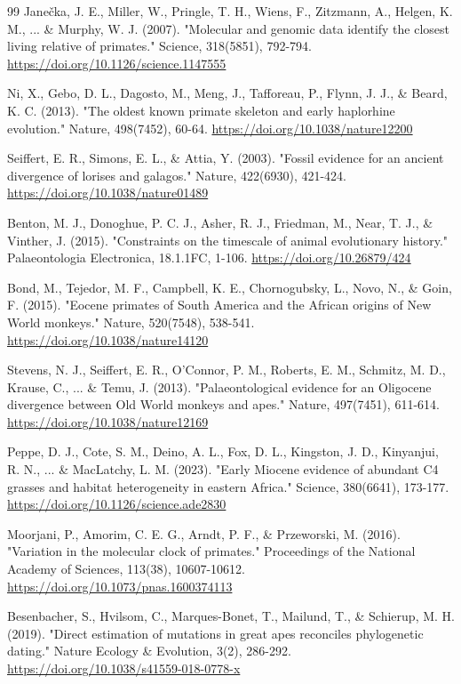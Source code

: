 \documentclass[10pt,letterpaper]{article}
\begin{document}
\begin{thebibliography}{99}
 Jane\v{c}ka, J. E., Miller, W., Pringle, T. H., Wiens, F., Zitzmann, A., Helgen, K. M., ... \& Murphy, W. J. (2007). "Molecular and genomic data identify the closest living relative of primates." Science, 318(5851), 792-794. \url{https://doi.org/10.1126/science.1147555}

 Ni, X., Gebo, D. L., Dagosto, M., Meng, J., Tafforeau, P., Flynn, J. J., \& Beard, K. C. (2013). "The oldest known primate skeleton and early haplorhine evolution." Nature, 498(7452), 60-64. \url{https://doi.org/10.1038/nature12200}

 Seiffert, E. R., Simons, E. L., \& Attia, Y. (2003). "Fossil evidence for an ancient divergence of lorises and galagos." Nature, 422(6930), 421-424. \url{https://doi.org/10.1038/nature01489}

 Benton, M. J., Donoghue, P. C. J., Asher, R. J., Friedman, M., Near, T. J., \& Vinther, J. (2015). "Constraints on the timescale of animal evolutionary history." Palaeontologia Electronica, 18.1.1FC, 1-106. \url{https://doi.org/10.26879/424}

 Bond, M., Tejedor, M. F., Campbell, K. E., Chornogubsky, L., Novo, N., \& Goin, F. (2015). "Eocene primates of South America and the African origins of New World monkeys." Nature, 520(7548), 538-541. \url{https://doi.org/10.1038/nature14120}

 Stevens, N. J., Seiffert, E. R., O'Connor, P. M., Roberts, E. M., Schmitz, M. D., Krause, C., ... \& Temu, J. (2013). "Palaeontological evidence for an Oligocene divergence between Old World monkeys and apes." Nature, 497(7451), 611-614. \url{https://doi.org/10.1038/nature12169}

 Peppe, D. J., Cote, S. M., Deino, A. L., Fox, D. L., Kingston, J. D., Kinyanjui, R. N., ... \& MacLatchy, L. M. (2023). "Early Miocene evidence of abundant C4 grasses and habitat heterogeneity in eastern Africa." Science, 380(6641), 173-177. \url{https://doi.org/10.1126/science.ade2830}

 Moorjani, P., Amorim, C. E. G., Arndt, P. F., \& Przeworski, M. (2016). "Variation in the molecular clock of primates." Proceedings of the National Academy of Sciences, 113(38), 10607-10612. \url{https://doi.org/10.1073/pnas.1600374113}

 Besenbacher, S., Hvilsom, C., Marques-Bonet, T., Mailund, T., \& Schierup, M. H. (2019). "Direct estimation of mutations in great apes reconciles phylogenetic dating." Nature Ecology \& Evolution, 3(2), 286-292. \url{https://doi.org/10.1038/s41559-018-0778-x}


\end{thebibliography}
\end{document}
